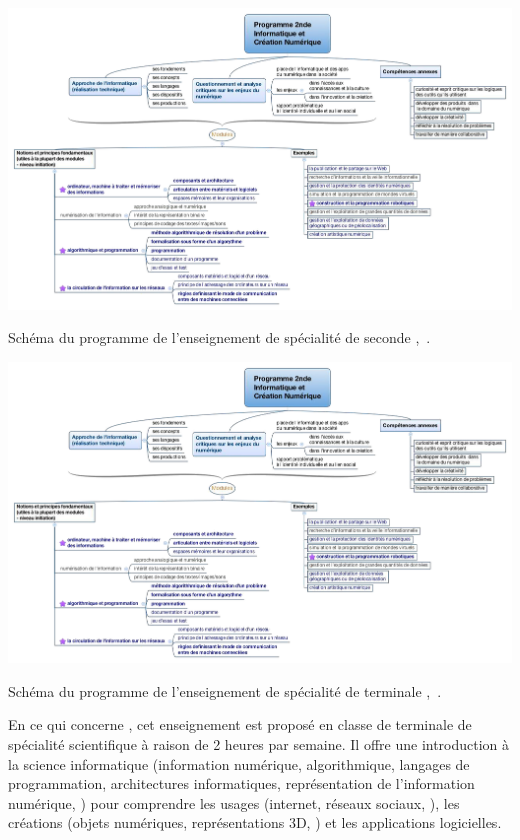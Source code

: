             \begin{table}
                \centering\label{tab:prog_ICN}
                \includegraphics[width=0.9\linewidth]{Figures/Programme_2nde_ICN_.png}
                \caption[Programme \textit{ICN}, Noirpoudre~\RI]{Schéma du programme de l’enseignement de spécialité de seconde ,~.}
            \end{table}        
            \begin{table}
                \centering\label{tab:prog_ISN}
                \includegraphics[width=0.9\linewidth]{Figures/Programme_2nde_ICN_.png}
                \caption[Programme \textit{ISN}, Noirpoudre~\RI]{Schéma du programme de l’enseignement de spécialité de terminale ,~.}
            \end{table}\par%
                En ce qui concerne , cet enseignement est proposé en classe de terminale de spécialité scientifique à raison de 2 heures par semaine. Il offre une introduction à la science informatique (information numérique, algorithmique, langages de programmation, architectures informatiques, représentation de l'information numérique, \etc) pour comprendre les usages (internet, réseaux sociaux, \etc), les créations (objets numériques, représentations 3D, \etc) et les applications logicielles. 
